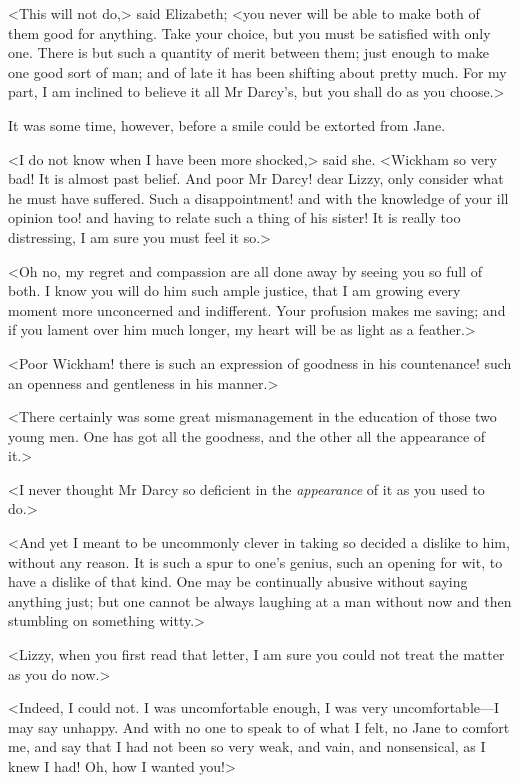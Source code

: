 <This will not do,> said Elizabeth; <you never will be able to make both of them good for anything. Take your choice, but you must be satisfied with only one. There is but such a quantity of merit between them; just enough to make one good sort of man; and of late it has been shifting about pretty much. For my part, I am inclined to believe it all Mr Darcy's, but you shall do as you choose.>

It was some time, however, before a smile could be extorted from Jane.

<I do not know when I have been more shocked,> said she. <Wickham so very bad! It is almost past belief. And poor Mr Darcy! dear Lizzy, only consider what he must have suffered. Such a disappointment! and with the knowledge of your ill opinion too! and having to relate such a thing of his sister! It is really too distressing, I am sure you must feel it so.>

<Oh no, my regret and compassion are all done away by seeing you so full of both. I know you will do him such ample justice, that I am growing every moment more unconcerned and indifferent. Your profusion makes me saving; and if you lament over him much longer, my heart will be as light as a feather.>

<Poor Wickham! there is such an expression of goodness in his countenance! such an openness and gentleness in his manner.>

<There certainly was some great mismanagement in the education of those two young men. One has got all the goodness, and the other all the appearance of it.>

<I never thought Mr Darcy so deficient in the \textit{appearance} of it as you used to do.>

<And yet I meant to be uncommonly clever in taking so decided a dislike to him, without any reason. It is such a spur to one's genius, such an opening for wit, to have a dislike of that kind. One may be continually abusive without saying anything just; but one cannot be always laughing at a man without now and then stumbling on something witty.>

<Lizzy, when you first read that letter, I am sure you could not treat the matter as you do now.>

<Indeed, I could not. I was uncomfortable enough, I was very uncomfortable—I may say unhappy. And with no one to speak to of what I felt, no Jane to comfort me, and say that I had not been so very weak, and vain, and nonsensical, as I knew I had! Oh, how I wanted you!>

